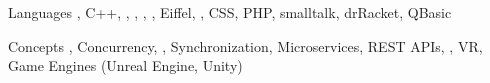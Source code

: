 

\begin{cvskills}

\cvskill
  {Languages} %
  {, C++, , , , , Eiffel, , CSS, PHP, smalltalk, drRacket, QBasic} %

\cvskill
  {Concepts} %
  {, Concurrency, , Synchronization, Microservices, REST APIs, , VR, Game Engines (Unreal Engine, Unity)} %

\end{cvskills}
